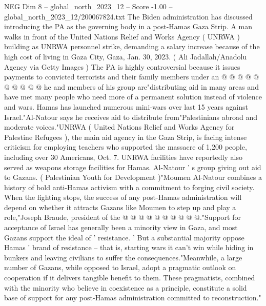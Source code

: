 \begin{textsample}{NEG Dim 8 – global\_north\_2023\_12 – Score -1.00 – global\_north\_2023\_12/200067824.txt}
The Biden administration has discussed introducing the PA as the governing body in a post-Hamas Gaza Strip.
A man walks in front of the United Nations Relief and Works Agency ( UNRWA ) building as UNRWA personnel strike, demanding a salary increase because of the high cost of living in Gaza City, Gaza, Jan. 30, 2023. ( Ali Jadallah/Anadolu Agency via Getty Images ) The PA is highly controversial because it issues payments to convicted terrorists and their family members under an @ @ @ @ @ @ @ @ @ @ he and members of his group are"distributing aid in many areas and have met many people who need more of a permanent solution instead of violence and wars.
Hamas has launched numerous mini-wars over last 15 years against Israel."Al-Natour says he receives aid to distribute from"Palestinians abroad and moderate voices."UNRWA ( United Nations Relief and Works Agency for Palestine Refugees ), the main aid agency in the Gaza Strip, is facing intense criticism for employing teachers who supported the massacre of 1,200 people, including over 30 Americans, Oct. 7.
UNRWA facilities have reportedly also served as weapons storage facilities for Hamas.
Al-Natour ' s group giving out aid to Gazans. ( Palestinian Youth for Development )"Moumen Al-Natour combines a history of bold anti-Hamas activism with a commitment to forging civil society.
When the fighting stops, the success of any post-Hamas administration will depend on whether it attracts Gazans like Moumen to step up and play a role,"Joseph Braude, president of the @ @ @ @ @ @ @ @ @ @."Support for acceptance of Israel has generally been a minority view in Gaza, and most Gazans support the ideal of ' resistance. ' But a substantial majority oppose Hamas ' brand of resistance -- that is, starting wars it can't win while hiding in bunkers and leaving civilians to suffer the consequences."Meanwhile, a large number of Gazans, while opposed to Israel, adopt a pragmatic outlook on cooperation if it delivers tangible benefit to them.
These pragmatists, combined with the minority who believe in coexistence as a principle, constitute a solid base of support for any post-Hamas administration committed to reconstruction."

\end{textsample}
